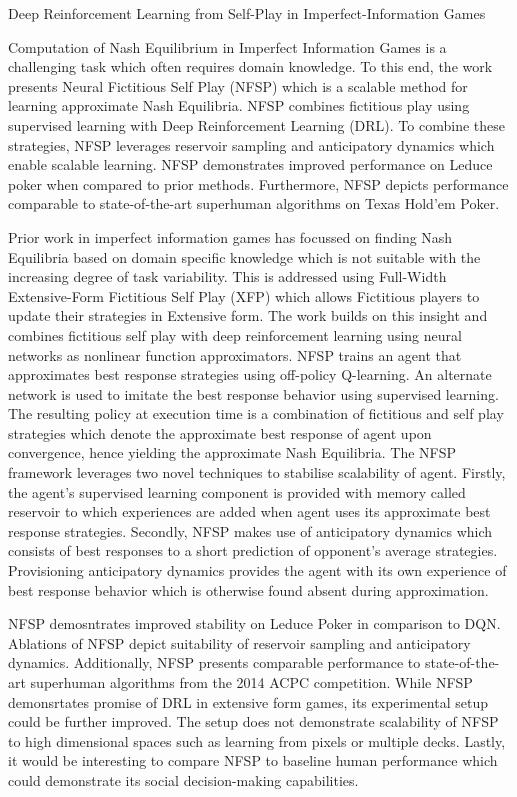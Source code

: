 \documentclass[11pt,letterpaper]{article}
\begin{document}
\begin{center}
  \large{Deep Reinforcement Learning from Self-Play in Imperfect-Information Games}
\end{center}
Computation of Nash Equilibrium in Imperfect Information Games is a challenging task which often requires domain knowledge. To this end, the work presents Neural Fictitious Self Play (NFSP) which is a scalable method for learning approximate Nash Equilibria. NFSP combines fictitious play using supervised learning with Deep Reinforcement Learning (DRL). To combine these strategies, NFSP leverages reservoir sampling and anticipatory dynamics which enable scalable learning. NFSP demonstrates improved performance on Leduce poker when compared to prior methods. Furthermore, NFSP depicts performance comparable to state-of-the-art superhuman algorithms on Texas Hold'em Poker. 

Prior work in imperfect information games has focussed on finding Nash Equilibria based on domain specific knowledge which is not suitable with the increasing degree of task variability. This is addressed using Full-Width Extensive-Form Fictitious Self Play (XFP) which allows Fictitious players to update their strategies in Extensive form. The work builds on this insight and combines fictitious self play with deep reinforcement learning using neural networks as nonlinear function approximators. NFSP trains an agent that approximates best response strategies using off-policy Q-learning. An alternate network is used to imitate the best response behavior using supervised learning. The resulting policy at execution time is a combination of fictitious and self play strategies which denote the approximate best response of agent upon convergence, hence yielding the approximate Nash Equilibria. The NFSP framework leverages two novel techniques to stabilise scalability of agent. Firstly, the agent's supervised learning component is provided with memory called reservoir to which experiences are added when agent uses its approximate best response strategies. Secondly, NFSP makes use of anticipatory dynamics which consists of best responses to a short prediction of opponent's average strategies. Provisioning anticipatory dynamics provides the agent with its own experience of best response behavior which is otherwise found absent during approximation. 

NFSP demosntrates improved stability on Leduce Poker in comparison to DQN. Ablations of NFSP depict suitability of reservoir sampling and anticipatory dynamics. Additionally, NFSP presents comparable performance to state-of-the-art superhuman algorithms from the 2014 ACPC competition. While NFSP demonsrtates promise of DRL in extensive form games, its experimental setup could be further improved. The setup does not demonstrate scalability of NFSP to high dimensional spaces such as learning from pixels or multiple decks. Lastly, it would be interesting to compare NFSP to baseline human performance which could demonstrate its social decision-making capabilities. 
\end{document}
